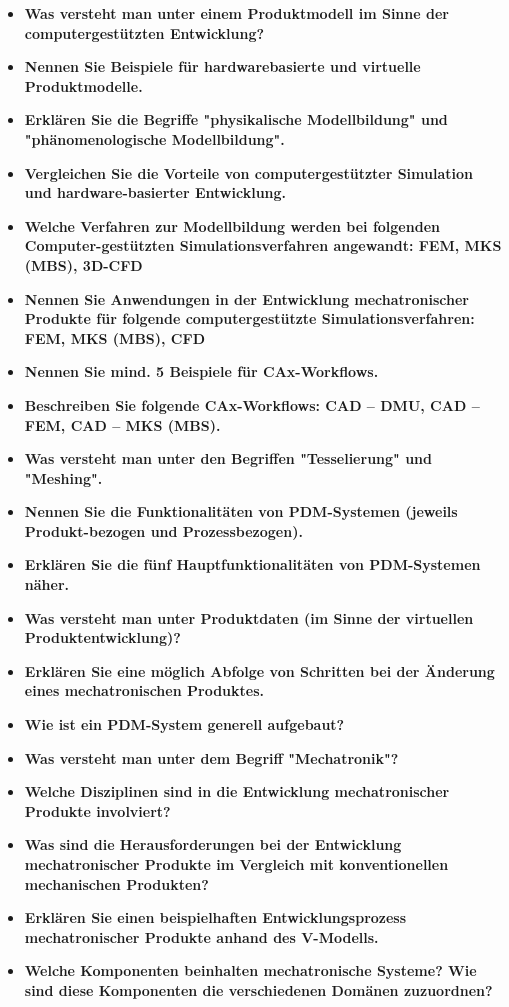\documentclass[10pt,a4paper,fleqn]{article}
\begin{document}
\begin{itemize}
	\item \textbf{Was versteht man unter einem Produktmodell im Sinne der computergestützten Entwicklung?}
	\item \textbf{Nennen Sie Beispiele für hardwarebasierte und virtuelle Produktmodelle.}
	\item \textbf{Erklären Sie die Begriffe "physikalische Modellbildung" und "phänomenologische Modellbildung".}
	\item \textbf{Vergleichen Sie die Vorteile von computergestützter Simulation und hardware-basierter Entwicklung.}
	\item \textbf{Welche Verfahren zur Modellbildung werden bei folgenden Computer-gestützten Simulationsverfahren angewandt: FEM, MKS (MBS), 3D-CFD}
	\item \textbf{Nennen Sie Anwendungen in der Entwicklung mechatronischer Produkte für folgende computergestützte Simulationsverfahren: FEM, MKS (MBS), CFD}
	\item \textbf{Nennen Sie mind. 5 Beispiele für CAx-Workflows.}
	\item \textbf{Beschreiben Sie folgende CAx-Workflows: CAD – DMU, CAD – FEM, CAD – MKS (MBS).}
	\item \textbf{Was versteht man unter den Begriffen "Tesselierung" und "Meshing".}
	\item \textbf{Nennen Sie die Funktionalitäten von PDM-Systemen (jeweils Produkt-bezogen und Prozessbezogen).}
	\item \textbf{Erklären Sie die fünf Hauptfunktionalitäten von PDM-Systemen näher.}
	\item \textbf{Was versteht man unter Produktdaten (im Sinne der virtuellen Produktentwicklung)?}
	\item \textbf{Erklären Sie eine möglich Abfolge von Schritten bei der Änderung eines mechatronischen Produktes.}
	\item \textbf{Wie ist ein PDM-System generell aufgebaut?}
	\item \textbf{Was versteht man unter dem Begriff "Mechatronik"?}
	\item \textbf{Welche Disziplinen sind in die Entwicklung mechatronischer Produkte involviert?}
	\item \textbf{Was sind die Herausforderungen bei der Entwicklung mechatronischer Produkte im Vergleich mit konventionellen mechanischen Produkten?}
	\item \textbf{Erklären Sie einen beispielhaften Entwicklungsprozess mechatronischer Produkte anhand des V-Modells.}
	\item \textbf{Welche Komponenten beinhalten mechatronische Systeme? Wie sind diese Komponenten die verschiedenen Domänen zuzuordnen?}

\end{itemize}
\end{document}
